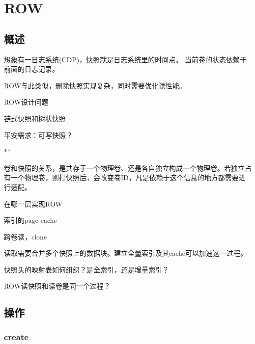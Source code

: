 \chapter{ROW}

\section{概述}

想象有一日志系统(CDP)，快照就是日志系统里的时间点。
当前卷的状态依赖于前面的日志记录。

ROW与此类似，删除快照实现复杂，同时需要优化读性能。

ROW设计问题
\begin{enumbox}
\item 链式快照和树状快照
\item 平安需求：可写快照？
\item ***
\item 卷和快照的关系，是共存于一个物理卷、还是各自独立构成一个物理卷。若独立占有一个物理卷，则打快照后，会改变卷ID，凡是依赖于这个信息的地方都需要进行适配。
\item 在哪一层实现ROW
\item 索引的page cache
\item 跨卷读，clone
\item 读取需要合并多个快照上的数据块。建立全量索引及其cache可以加速这一过程。
\item 快照头的映射表如何组织？是全索引，还是增量索引？
\item ROW读快照和读卷是同一个过程？
\end{enumbox}

\section{操作}

\subsection{create}

